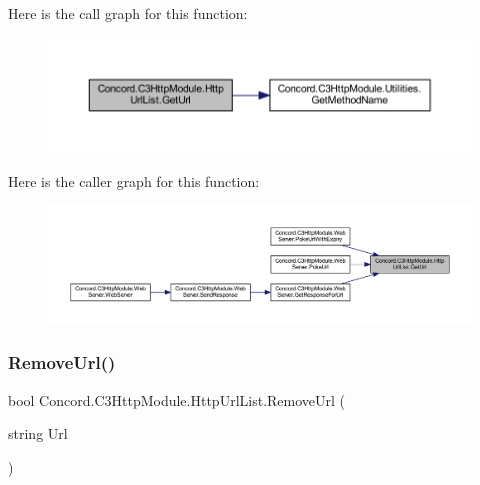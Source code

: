 Here is the call graph for this function\+:
\nopagebreak
\begin{figure}[H]
\begin{center}
\leavevmode
\includegraphics[width=350pt]{class_concord_1_1_c3_http_module_1_1_http_url_list_a561da818d67bb58784165f31e53fe2d4_cgraph}
\end{center}
\end{figure}
Here is the caller graph for this function\+:
\nopagebreak
\begin{figure}[H]
\begin{center}
\leavevmode
\includegraphics[width=350pt]{class_concord_1_1_c3_http_module_1_1_http_url_list_a561da818d67bb58784165f31e53fe2d4_icgraph}
\end{center}
\end{figure}
\mbox{\label{class_concord_1_1_c3_http_module_1_1_http_url_list_acddaf4910903d915828c82b7c61f3fdc}} 
\subsubsection{\texorpdfstring{RemoveUrl()}{RemoveUrl()}}
{\footnotesize\ttfamily bool Concord.\+C3\+Http\+Module.\+Http\+Url\+List.\+Remove\+Url (\begin{DoxyParamCaption}\item[{string}]{Url }\end{DoxyParamCaption})\hspace{0.3cm}{\ttfamily [inline]}}



